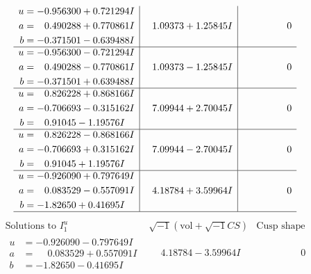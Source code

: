 \documentclass[1p]{elsarticle_modified}
\theoremstyle{definition}
\newcommand{\I}{\sqrt{-1}}
\begin{document}
$$\begin{array}{c|c|c}
\begin{aligned}
u &= -0.956300 + 0.721294 I \\
a &= \phantom{-}0.490288 + 0.770861 I \\
b &= -0.371501 - 0.639488 I\end{aligned}
 & \phantom{-}1.09373 + 1.25845 I & \phantom{-0.000000 } 0 \\ \hline\begin{aligned}
u &= -0.956300 - 0.721294 I \\
a &= \phantom{-}0.490288 - 0.770861 I \\
b &= -0.371501 + 0.639488 I\end{aligned}
 & \phantom{-}1.09373 - 1.25845 I & \phantom{-0.000000 } 0 \\ \hline\begin{aligned}
u &= \phantom{-}0.826228 + 0.868166 I \\
a &= -0.706693 - 0.315162 I \\
b &= \phantom{-}0.91045 - 1.19576 I\end{aligned}
 & \phantom{-}7.09944 + 2.70045 I & \phantom{-0.000000 } 0 \\ \hline\begin{aligned}
u &= \phantom{-}0.826228 - 0.868166 I \\
a &= -0.706693 + 0.315162 I \\
b &= \phantom{-}0.91045 + 1.19576 I\end{aligned}
 & \phantom{-}7.09944 - 2.70045 I & \phantom{-0.000000 } 0 \\ \hline\begin{aligned}
u &= -0.926090 + 0.797649 I \\
a &= \phantom{-}0.083529 - 0.557091 I \\
b &= -1.82650 + 0.41695 I\end{aligned}
 & \phantom{-}4.18784 + 3.59964 I & \phantom{-0.000000 } 0\\
 \hline 
 \end{array}$$\newpage$$\begin{array}{c|c|c}  
\text{Solutions to }I^u_{1}& \I (\text{vol} + \sqrt{-1}CS) & \text{Cusp shape}\\
 \hline 
\begin{aligned}
u &= -0.926090 - 0.797649 I \\
a &= \phantom{-}0.083529 + 0.557091 I \\
b &= -1.82650 - 0.41695 I\end{aligned}
 & \phantom{-}4.18784 - 3.59964 I & \phantom{-0.000000 } 0 \\ \hline\begin{aligned}

\end{aligned}
\end{array}$$
\end{document}
